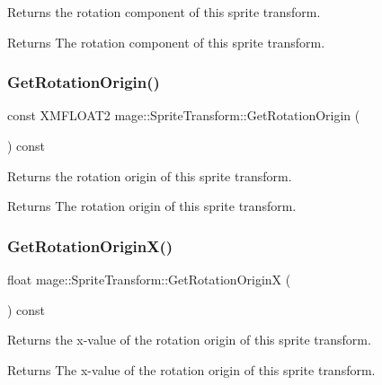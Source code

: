 Returns the rotation component of this sprite transform.

\begin{DoxyReturn}{Returns}
The rotation component of this sprite transform. 
\end{DoxyReturn}
\hypertarget{structmage_1_1_sprite_transform_a8adc22a8d6c32d1b2a49ac78707262f9}{}\label{structmage_1_1_sprite_transform_a8adc22a8d6c32d1b2a49ac78707262f9} 
\subsubsection{\texorpdfstring{Get\+Rotation\+Origin()}{GetRotationOrigin()}}
{\footnotesize\ttfamily const X\+M\+F\+L\+O\+A\+T2 mage\+::\+Sprite\+Transform\+::\+Get\+Rotation\+Origin (\begin{DoxyParamCaption}{ }\end{DoxyParamCaption}) const}

Returns the rotation origin of this sprite transform.

\begin{DoxyReturn}{Returns}
The rotation origin of this sprite transform. 
\end{DoxyReturn}
\hypertarget{structmage_1_1_sprite_transform_abf3a72d9f594aa157608070d69f4428e}{}\label{structmage_1_1_sprite_transform_abf3a72d9f594aa157608070d69f4428e} 
\subsubsection{\texorpdfstring{Get\+Rotation\+Origin\+X()}{GetRotationOriginX()}}
{\footnotesize\ttfamily float mage\+::\+Sprite\+Transform\+::\+Get\+Rotation\+OriginX (\begin{DoxyParamCaption}{ }\end{DoxyParamCaption}) const}

Returns the x-\/value of the rotation origin of this sprite transform.

\begin{DoxyReturn}{Returns}
The x-\/value of the rotation origin of this sprite transform. 
\end{DoxyReturn}
\hypertarget{structmage_1_1_sprite_transform_a0f6056a96c419817211efce6687e1d89}{}\label{structmage_1_1_sprite_transform_a0f6056a96c419817211efce6687e1d89} 
